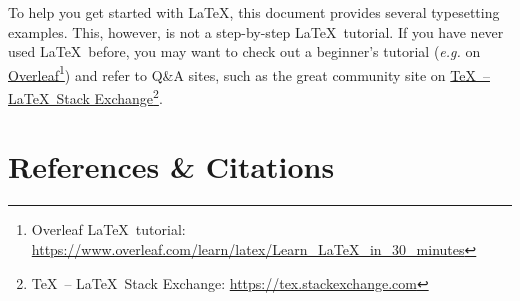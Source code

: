 \documentclass[11pt,a4paper]{article}
\begin{document}
To help you get started with \LaTeX, this document provides several typesetting examples.
This, however, is not a step-by-step \LaTeX~tutorial.
If you have never used \LaTeX~before, you may want to check out a beginner's tutorial (\emph{e.g.} on \href{https://www.overleaf.com/learn/latex/Learn_LaTeX_in_30_minutes}{Overleaf}\footnote{Overleaf \LaTeX~tutorial: \url{https://www.overleaf.com/learn/latex/Learn_LaTeX_in_30_minutes}}) and refer to Q\&A sites, such as the great community site on \href{https://tex.stackexchange.com}{\TeX~-- \LaTeX~Stack Exchange}\footnote{\TeX~-- \LaTeX~Stack Exchange: \url{https://tex.stackexchange.com}}.

\newpage
\section{References \& Citations}
\label{sec-references}
\end{document}

